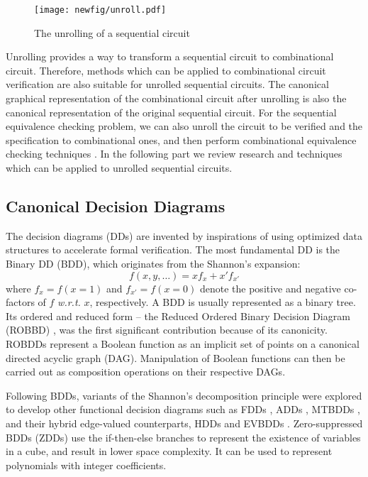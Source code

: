 \begin{figure}[h]
\centerline{
\texttt{[image: newfig/unroll.pdf]}
}
\caption{The unrolling of a sequential circuit}
\label{fig:unrolling}
\end{figure}

Unrolling provides a way to transform a sequential circuit to combinational 
circuit. Therefore,  methods which can be applied to combinational circuit 
verification are also suitable for unrolled sequential circuits. The canonical 
graphical representation of the combinational circuit after unrolling is also 
the canonical representation of the original sequential circuit. For the sequential 
equivalence checking problem, we can also unroll the circuit to be verified and the 
specification to combinational ones, and then perform combinational equivalence checking
techniques \cite{savoj2010combinational}. In the following part we review research and techniques which 
can be applied to unrolled sequential circuits.

\subsection{Canonical Decision Diagrams}
The decision diagrams (DDs) are invented by inspirations of 
using optimized data structures to accelerate formal verification.
The most fundamental DD is the Binary DD (BDD), which originates from the 
Shannon's expansion:
\begin{equation}
f(x, y, \dots) = x f_x + x' f_{x'}
\end{equation}
where $f_x = f(x = 1)$ and $f_{x'} = f(x = 0)$ denote the positive and
negative co-factors of $f$ {\it w.r.t.} $x$, respectively.
A BDD is usually represented as a binary tree.
Its ordered and reduced form -- the Reduced Ordered Binary Decision Diagram (ROBBD)
\cite{BRYA86}, was the first significant contribution because of its canonicity.  
 ROBDDs represent a Boolean function as an
implicit set of points on a canonical directed acyclic graph
(DAG). Manipulation of Boolean functions can then be carried out as
composition operations on their respective DAGs. 

Following BDDs,  variants of the Shannon's decomposition principle
were explored to develop other functional decision diagrams such as
 FDDs \cite{okfdd}, ADDs \cite{add}, MTBDDs \cite{mtbdd}, and their hybrid 
edge-valued counterparts, HDDs \cite{hdd} and EVBDDs \cite{evbdd}. 
Zero-suppressed BDDs (ZDDs) \cite{minato1993zero,minato1994calculation} use the if-then-else branches
to represent the existence of variables in a cube, and result in lower 
space complexity. It can be used to represent polynomials with integer coefficients.

